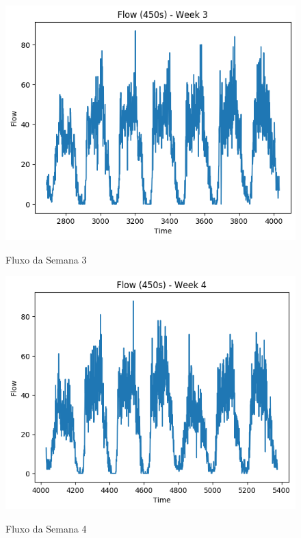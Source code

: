 \begin{figure}[h]
    \centering
    \includegraphics[scale=0.9]{monography/img/flows/flow_450_week_03.png}
    \label{figure:flow_450_week_03}
    \caption{Fluxo da Semana 3}
\end{figure}

\begin{figure}[h]
    \centering
    \includegraphics[scale=0.9]{monography/img/flows/flow_450_week_04.png}
    \label{figure:flow_450_week_04}
    \caption{Fluxo da Semana 4}
\end{figure}

